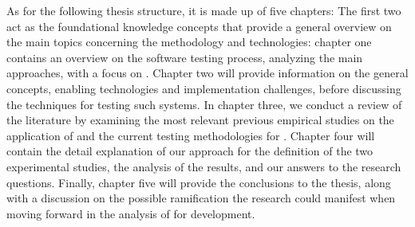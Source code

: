 As for the following thesis structure, it is made up of five chapters:
The first two act as the foundational knowledge concepts that provide a general overview on the main topics concerning the \tdd methodology and \es technologies: chapter one contains an overview on the software testing process, analyzing the main approaches, with a focus on \tdd. Chapter two will provide information on the general \ess concepts, enabling technologies and implementation challenges, before discussing the techniques for testing such systems.
In chapter three, we conduct a review of the literature by examining the most relevant previous empirical studies on the application of \tdd and the current testing methodologies for \es.
Chapter four will contain the detail explanation of our approach for the definition of the two experimental studies, the analysis of the results, and our answers to the research questions.
Finally, chapter five will provide the conclusions to the thesis, along with a discussion on the possible ramification the research could manifest when moving forward in the analysis of \tdd for \es development.